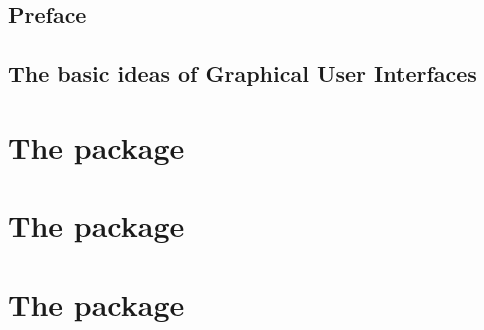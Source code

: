\documentclass[showtrims, letterpaper]{memoir}
\begin{document}
\thispagestyle{empty}
%

\frontmatter

\chapter*{Preface}
\label{chap:preface}

\newpage



\setcounter{tocdepth}{3}
\tableofcontents
\newpage



\graphicspath{
  {ch-Preface/}
  {ch-GUIBasics/}
  {ch-ProgrammingPractices/}
  {ch-gWidgets/}
  {ch-RGtk2/}
  {ch-Qt/}
  {ch-tcltk/}
}


\mainmatter
\chapter{The basic ideas of Graphical User Interfaces}
\label{chap:GUIBasics}






\part{The  package}
\label{chap:gWidgets-intro}



\part{The  package}
\label{chap:RGtk2}


\part{The  package}
\label{chap:Qt}

\end{document}
